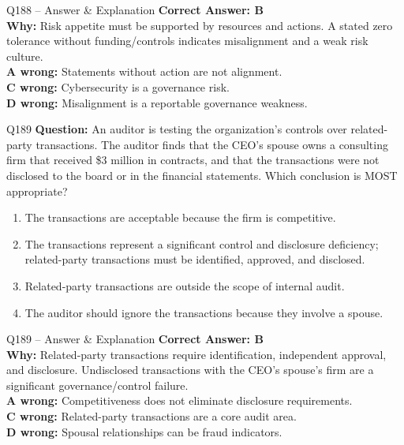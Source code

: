 \documentclass[aspectratio=169,10pt]{beamer}
\begin{document}
	\begin{frame}[t]{Q188 -- Answer \& Explanation}
		\small
		\textbf{Correct Answer: B} \\[4pt]
		\textbf{Why:} Risk appetite must be supported by resources and actions. A stated zero tolerance without funding/controls indicates misalignment and a weak risk culture. \\[4pt]
		\textbf{A wrong:} Statements without action are not alignment. \\[2pt]
		\textbf{C wrong:} Cybersecurity is a governance risk. \\[2pt]
		\textbf{D wrong:} Misalignment is a reportable governance weakness.
	\end{frame}
	
	\begin{frame}[t]{Q189}
		\small
		\textbf{Question:} An auditor is testing the organization's controls over related-party transactions. The auditor finds that the CEO's spouse owns a consulting firm that received \$3 million in contracts, and that the transactions were not disclosed to the board or in the financial statements. Which conclusion is MOST appropriate?
		\begin{enumerate}[label=\Alph*.,itemsep=1pt,topsep=2pt]
			\item The transactions are acceptable because the firm is competitive.
			\item The transactions represent a significant control and disclosure deficiency; related-party transactions must be identified, approved, and disclosed.
			\item Related-party transactions are outside the scope of internal audit.
			\item The auditor should ignore the transactions because they involve a spouse.
		\end{enumerate}
	\end{frame}
	
	\begin{frame}[t]{Q189 -- Answer \& Explanation}
		\small
		\textbf{Correct Answer: B} \\[4pt]
		\textbf{Why:} Related-party transactions require identification, independent approval, and disclosure. Undisclosed transactions with the CEO's spouse's firm are a significant governance/control failure. \\[4pt]
		\textbf{A wrong:} Competitiveness does not eliminate disclosure requirements. \\[2pt]
		\textbf{C wrong:} Related-party transactions are a core audit area. \\[2pt]
		\textbf{D wrong:} Spousal relationships can be fraud indicators.
	\end{frame}
	
\end{document}
